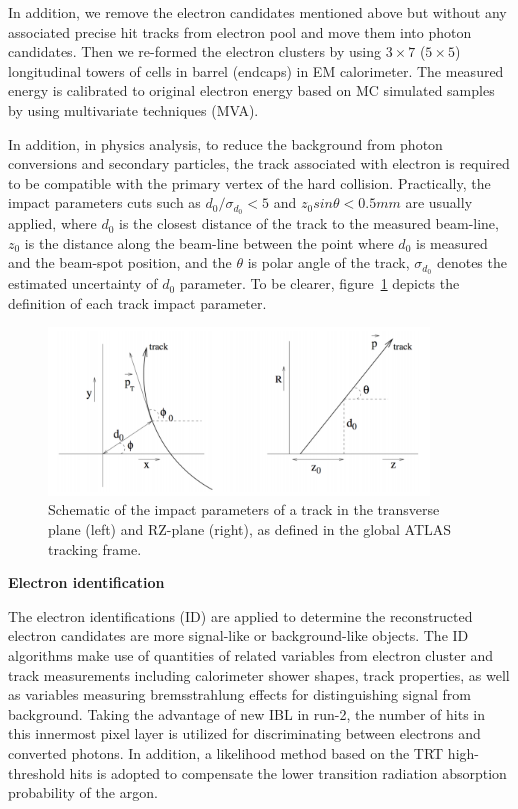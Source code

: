 \begin{enumerate}
In addition, we remove the electron candidates mentioned above but without any associated precise hit tracks from electron pool and move them into photon candidates. Then we re-formed the electron clusters by using $3 \times 7$ ($5 \times 5$) longitudinal towers of cells in barrel (endcaps) in EM calorimeter. The measured energy is calibrated to original electron energy based on MC simulated samples by using multivariate techniques (MVA).
\end{enumerate}

In addition, in physics analysis, to reduce the background from photon conversions and secondary particles, the track associated with electron is required to be compatible with the primary vertex of the hard collision. 
Practically, the impact parameters cuts such as $d_{0}/\sigma_{d_{0}} < 5$ and $z_{0}sin\theta < 0.5mm$ are usually applied, where $d_{0}$ is the closest distance of the track to the measured beam-line, $z_{0}$ is the distance along the beam-line between the point where $d_{0}$ is measured and the beam-spot position, and the $\theta$ is polar angle of the track, $\sigma_{d_{0}}$ denotes the estimated uncertainty of $d_{0}$ parameter. 
To be clearer, figure~\ref{fig:ele_d0z0} depicts the definition of each track impact parameter.
\begin{figure}[!htb]
  \centering
  \includegraphics[width=0.9\textwidth]{figures/Simulation/track_parameter_2d.png}
  \caption{Schematic of the impact parameters of a track in the transverse plane (left)
and RZ-plane (right), as defined in the global ATLAS tracking frame\cite{Limper:1202457}.}
  \label{fig:ele_d0z0}
\end{figure}

\textbf{Electron identification}

The electron identifications (ID) are applied to determine the reconstructed electron candidates are more signal-like or background-like objects.
The ID algorithms make use of quantities of related variables from electron cluster and track measurements including calorimeter shower shapes, track properties, 
as well as variables measuring bremsstrahlung effects for distinguishing signal from background.
Taking the advantage of new IBL in run-2, the number of hits in this innermost pixel layer is utilized for discriminating between electrons and converted photons.
In addition, a likelihood method based on the TRT high-threshold hits is adopted to compensate the lower transition radiation absorption probability of the argon.

